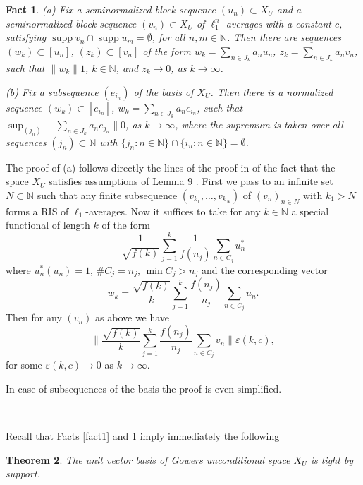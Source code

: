 \documentclass{amsart}
\newtheorem{theorem}{Theorem}[section]
\newtheorem{fact}[theorem]{Fact}
\numberwithin{subsection}{section}
\numberwithin{equation}{section}
\begin{document}
\begin{fact}\label{fact2} 
(a) Fix a seminormalized block sequence $(u_n)\subset X_U$ and a seminormalized block sequence $(v_n)\subset X_U$ of $\ell_1^n$-averages with a constant $c$, satisfying $\operatorname{supp} v_n\cap \operatorname{supp} u_m=\emptyset$, for all $n,m\in{{\mathbb{N}}}$. Then there are sequences $(w_k)\subset [u_n]$, $(z_k)\subset [v_n]$ of the form $w_k=\sum_{n\in J_k}a_nu_n$, $z_k=\sum_{n\in J_k}a_nv_n$, such that ${\lVert w_k\rVert}1$, $k\in{{\mathbb{N}}}$, and $z_k\to 0$, as $k\to\infty$. 

(b) Fix a subsequence $(e_{i_n})$ of the basis of $X_U$. Then there is a normalized sequence $(w_k)\subset [e_{i_n}]$, $w_k=\sum_{n\in J_k}a_ne_{i_n}$, such that $\sup_{(j_n)}{\lVert \sum_{n\in J_k}a_ne_{j_n}\rVert} 0$, as $k\to\infty$, where the supremum is taken over all sequences $(j_n)\subset {{\mathbb{N}}}$ with $\{j_n: n\in {{\mathbb{N}}}\}\cap \{i_n: n\in {{\mathbb{N}}}\}=\emptyset$. 
\end{fact}
The proof of (a) follows directly the lines of the proof in \cite{G} of the fact that the space $X_U$ satisfies assumptions of Lemma 9 \cite{G}. First we pass to an infinite set $N\subset {{\mathbb{N}}}$ such that any finite subsequence $(v_{k_1}, \dots,v_{k_N})$ of $(v_n)_{n\in N}$ with $k_1>N$  forms a RIS of $\ell_1$-averages. Now it suffices to take  for any $k\in{{\mathbb{N}}}$ a special functional of length $k$ of the form 
$$
\frac{1}{\sqrt{f(k)}}\sum_{j=1}^k\frac{1}{f(n_j)}\sum_{n\in C_j}u_n^*
$$
where $u_n^*(u_n)=1$, $\# C_j=n_j$, $\min C_j>n_j$ and the corresponding vector 
$$
w_k=\frac{\sqrt{f(k)}}{k}\sum_{j=1}^k\frac{f(n_j)}{n_j}\sum_{n\in C_j}u_n.
$$
Then for any $(v_n)$ as above we have 
$$
{\lVert \frac{\sqrt{f(k)}}{k}\sum_{j=1}^k\frac{f(n_j)}{n_j}\sum_{n\in C_j}v_n\rVert}{\varepsilon}(k,c),
$$ 
for some ${\varepsilon}(k,c)\to 0$ as $k\to\infty$. 

In case of subsequences of the basis the proof is even simplified. 

\

Recall that Facts \ref{fact1} and \ref{fact2} imply immediately the following
\begin{theorem}\cite{FR1,G2}
 The unit vector basis of Gowers unconditional space $X_U$ is tight by support. 
\end{theorem}
\end{document}
